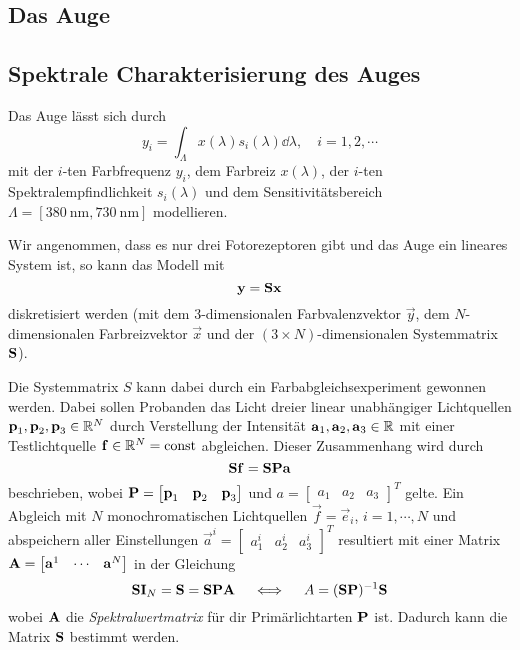 		\subsection{Das Auge} %

		\subsection{Spektrale Charakterisierung des Auges}
			Das Auge lässt sich durch
			\begin{equation*}
				y_i = \int_{\Lambda} \! x(\lambda) s_i(\lambda) \dd{\lambda},\quad i = 1, 2, \cdots
			\end{equation*}
			mit der \(i\)-ten Farbfrequenz \(y_i\), dem Farbreiz \(x(\lambda)\), der \(i\)-ten Spektralempfindlichkeit \(s_i(\lambda)\) und dem Sensitivitätsbereich \( \Lambda = [\SI{380}{\nano\meter}, \SI{730}{\nano\meter}] \) modellieren.
			
			Wir angenommen, dass es nur drei Fotorezeptoren gibt und das Auge ein lineares System ist, so kann das Modell mit
			\begin{equation*}
				\boldsymbol{\mathrm{y}} = \boldsymbol{\mathrm{S}} \boldsymbol{\mathrm{x}}
			\end{equation*}
			diskretisiert werden (mit dem 3-dimensionalen Farbvalenzvektor \(\vec{y}\), dem \(N\)-dimensionalen Farbreizvektor \(\vec{x}\) und der \( (3 \times N) \)-dimensionalen Systemmatrix \( \boldsymbol{\mathrm{S}} \)).
			
			Die Systemmatrix \(S\) kann dabei \zB durch ein Farbabgleichsexperiment gewonnen werden. Dabei sollen Probanden das Licht dreier linear unabhängiger Lichtquellen \( \boldsymbol{\mathrm{p}}_1, \boldsymbol{\mathrm{p}}_2, \boldsymbol{\mathrm{p}}_3 \in \mathbb{R}^N \) durch Verstellung der Intensität \( \boldsymbol{\mathrm{a}}_1, \boldsymbol{\mathrm{a}}_2, \boldsymbol{\mathrm{a}}_3 \in \mathbb{R} \) mit einer Testlichtquelle \( \boldsymbol{\mathrm{f}} \in \mathbb{R}^N = \operatorname{const} \) abgleichen. Dieser Zusammenhang wird durch
			\begin{equation*}
				\boldsymbol{\mathrm{S}} \boldsymbol{\mathrm{f}} = \boldsymbol{\mathrm{S}} \boldsymbol{\mathrm{P}} \boldsymbol{\mathrm{a}}
			\end{equation*}
			beschrieben, wobei \( \boldsymbol{\mathrm{P}} = \begin{bmatrix} \boldsymbol{\mathrm{p}}_1 & \boldsymbol{\mathrm{p}}_2 & \boldsymbol{\mathrm{p}}_3 \end{bmatrix} \) und \( a = \begin{bmatrix} a_1 & a_2 & a_3 \end{bmatrix}^T \) gelte. Ein Abgleich mit \(N\) monochromatischen Lichtquellen \( \vec{f} = \vec{e}_i \), \( i = 1, \cdots, N \) und abspeichern aller Einstellungen \( \vec{a}^i = \begin{bmatrix} a_1^i & a_2^i & a_3^i \end{bmatrix}^T \) resultiert mit einer Matrix \( \boldsymbol{\mathrm{A}} = \begin{bmatrix} \boldsymbol{\mathrm{a}}^1 & \cdots & \boldsymbol{\mathrm{a}}^N \end{bmatrix} \) in der Gleichung
			\begin{equation*}
				\boldsymbol{\mathrm{S}} \boldsymbol{\mathrm{I}}_N = \boldsymbol{\mathrm{S}} = \boldsymbol{\mathrm{S}} \boldsymbol{\mathrm{P}} \boldsymbol{\mathrm{A}} \quad\iff\quad A = ( \boldsymbol{\mathrm{S}} \boldsymbol{\mathrm{P}} )^{-1} \boldsymbol{\mathrm{S}}
			\end{equation*}
			wobei \( \boldsymbol{\mathrm{A}} \) die \emph{Spektralwertmatrix} für dir Primärlichtarten \( \boldsymbol{\mathrm{P}} \) ist. Dadurch kann die Matrix \( \boldsymbol{\mathrm{S}} \) bestimmt werden.

